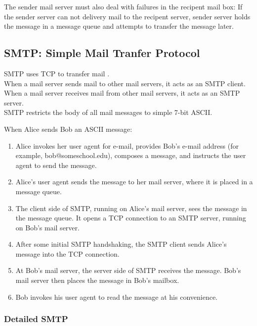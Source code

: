 The sender mail server must also deal with failures in the recipent mail
box: If the sender server can not delivery mail to the recipent server,
sender server holds the message in a message
queue and attempts to transfer the message later.


\subsection{SMTP: Simple Mail Tranfer Protocol}

\hf
SMTP uses TCP to transfer mail .\\

When a mail server sends mail to other mail servers, it acts as an SMTP
client. When a mail server receives mail from other mail servers, it acts as
an SMTP server.\\

SMTP restricts the body of all mail messages to simple 7-bit ASCII.


When Alice sends Bob an ASCII message:
\begin{enumerate}
    \item Alice invokes her user agent for e-mail, provides Bob’s e-mail address (for
          example, bob@someschool.edu), composes a message, and instructs the
          user agent to send the message.
    \item Alice’s user agent sends the message to her mail server, where it is placed in a
          message queue.
    \item The client side of SMTP, running on Alice’s mail server, sees the message in
          the message queue. It opens a TCP connection to an SMTP server, running on
          Bob’s mail server.
    \item After some initial SMTP handshaking, the SMTP client sends Alice’s message
          into the TCP connection.
    \item At Bob’s mail server, the server side of SMTP receives the message. Bob’s
          mail server then places the message in Bob’s mailbox.
    \item Bob invokes his user agent to read the message at his convenience.
\end{enumerate}

\subsubsection{Detailed SMTP}

